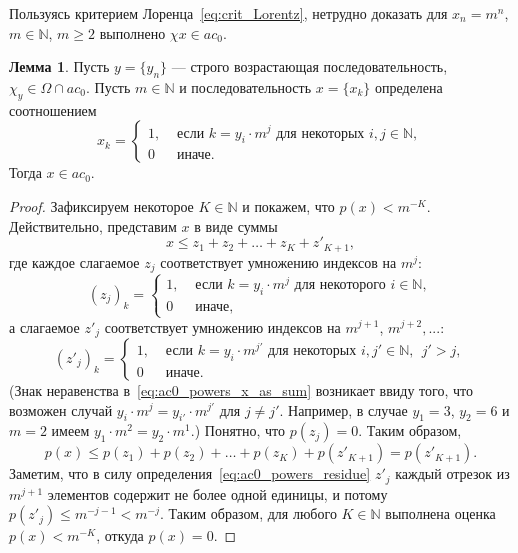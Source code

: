 \documentclass[a4paper,openbib]{article}
\theoremstyle{definition}
\newtheorem{lemma}{Лемма}[section]
\begin{document}
Пользуясь критерием Лоренца~\eqref{eq:crit_Lorentz},
нетрудно доказать для $x_n = m^n$, $m\in\mathbb{N}$, $m\geq 2$ выполнено $\chi x \in ac_0$.

\begin{lemma}
	Пусть $y = \{y_n\}$ --- строго возрастающая последовательность,
	$\chi_y\in\Omega \cap ac_0$.
	Пусть $m \in \mathbb{N}$
	и последовательность $x=\{x_k\}$ определена соотношением
	\begin{equation}
		x_k = \begin{cases}
			1, &\mbox{~если~} k = y_i \cdot m^j \mbox{~для некоторых~} i,j\in\mathbb{N},
			\\
			0  &\mbox{~иначе}
			.
		\end{cases}
	\end{equation}
	Тогда $x\in ac_0$.
\end{lemma}

\begin{proof}
	Зафиксируем некоторое $K \in \mathbb{N}$ и покажем, что $p(x) < m^{-K}$.
	Действительно, представим $x$ в виде суммы
	\begin{equation}
		\label{eq:ac0_powers_x_as_sum}
		x \leq z_1 + z_2 + \dots + z_K + z'_{K+1}
		,
	\end{equation}
	где каждое слагаемое $z_j$ соответствует умножению индексов на $m^j$:
	\begin{equation}
		(z_j)_k = \begin{cases}
			1, &\mbox{~если~} k = y_i \cdot m^j \mbox{~для некоторого~} i\in\mathbb{N},
			\\
			0  &\mbox{~иначе}
			,
		\end{cases}
	\end{equation}
	а слагаемое $z'_j$ соответствует умножению индексов на $m^{j+1}$, $m^{j+2},...$:
	\begin{equation}
		\label{eq:ac0_powers_residue}
		(z'_j)_k = \begin{cases}
			1, &\mbox{~если~} k = y_i \cdot m^{j'} \mbox{~для некоторых~} i,j'\in\mathbb{N},~~ j' > j
			,%
			\\
			0  &\mbox{~иначе}
			.
		\end{cases}
	\end{equation}
	(Знак неравенства в~\eqref{eq:ac0_powers_x_as_sum} возникает ввиду того, что возможен случай
	$y_i \cdot m^j = y_{i'} \cdot m^{j'}$ для $j\neq j'$.
	Например, в случае $y_1 = 3$, $y_2 = 6$ и $m=2$ имеем $y_1 \cdot m^2 = y_2 \cdot m^1$.)
	Понятно, что $p(z_j)=0$.
	Таким образом,
	\begin{equation}
		p(x) \leq p(z_1) + p(z_2) + \dots + p(z_K) + p(z'_{K+1}) = p(z'_{K+1})
		.
	\end{equation}
	Заметим, что в силу определения~\eqref{eq:ac0_powers_residue} $z'_j$ каждый отрезок из $m^{j+1}$ элементов
	содержит не более одной единицы, и потому $p(z'_j) \leq m^{-j-1} < m^{-j}$.
	Таким образом, для любого $K\in\mathbb{N}$ выполнена оценка $p(x) < m^{-K}$,
	откуда $p(x) = 0$.
\end{proof}
\end{document}

